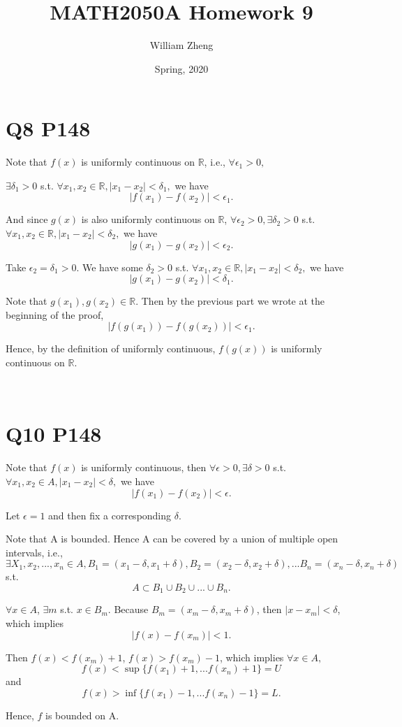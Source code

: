 \documentclass[12pt]{article}%
\begin{document}
\title{MATH2050A Homework 9}
\author{William Zheng}
\date{Spring, 2020}
\maketitle


\section{Q8 P148}
Note that $f(x)$ is uniformly continuous on $\mathbb{R}$, i.e., $\forall \epsilon_1>0,$ 

$\exists \delta_1>0$ s.t. $\forall x_1,x_2\in \mathbb{R}, |x_1-x_2|<\delta_1,$ we have $$|f(x_1)-f(x_2)|<\epsilon_1.$$ 

And since $g(x)$ is also uniformly continuous on $\mathbb{R}$, $\forall \epsilon_2>0, \exists \delta_2>0$ s.t. $\forall x_1,x_2\in \mathbb{R}, |x_1-x_2|<\delta_2,$ we have $$|g(x_1)-g(x_2)|<\epsilon_2.$$ 

Take $\epsilon_2 = \delta_1>0.$ We have some $\delta_2>0$ s.t. $\forall x_1,x_2\in \mathbb{R}, |x_1-x_2|<\delta_2,$ we have $$|g(x_1)-g(x_2)|<\delta_1.$$ 

Note that $g(x_1),g(x_2) \in \mathbb{R}.$ Then by the previous part we wrote at the beginning of the proof, $$ |f(g(x_1))-f(g(x_2))|<\epsilon_1.$$

Hence, by the definition of uniformly continuous, $f(g(x))$ is uniformly continuous on $\mathbb{R}$.


~\

\section{Q10 P148}

Note that $f(x)$ is uniformly continuous, then $\forall \epsilon>0, \exists \delta>0$ s.t. $\forall x_1,x_2\in A, |x_1-x_2|<\delta,$ we have $$|f(x_1)-f(x_2)|<\epsilon.$$

Let $\epsilon=1$ and then fix a corresponding $\delta.$

Note that A is bounded. Hence A can be covered by a union of multiple open intervals, i.e., $\exists X_1,x_2,...,x_n \in A, B_1=(x_1-\delta, x_1+\delta), B_2=(x_2-\delta, x_2+\delta),...B_n=(x_n-\delta, x_n+\delta)$ s.t. $$A \subset B_1 \cup B_2 \cup ...\cup B_n.$$

$\forall x\in A$, $\exists m$ s.t. $x \in B_m.$ Because $B_m=(x_m-\delta, x_m+\delta)$, then $|x-x_m|<\delta$, which implies $$|f(x)-f(x_m)|<1.$$

Then $f(x)<f(x_m)+1$, $f(x)>f(x_m)-1$, which implies $\forall x\in A,$ $$f(x)<\sup\{f(x_1)+1,...f(x_n)+1\}=U$$ and $$f(x)>\inf\{f(x_1)-1,...f(x_n)-1\}=L.$$

Hence, $f$ is bounded on A. 
\end{document}
